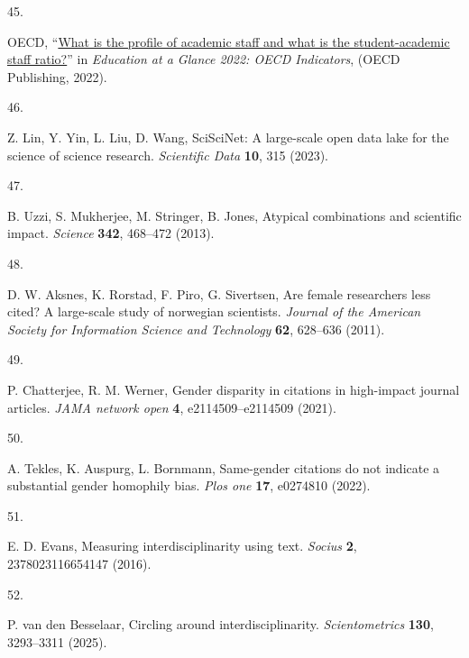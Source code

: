 \documentclass[
  british,
  12pt, %
]{article}
\newlength{\cslhangindent}
\newlength{\csllabelwidth}
\newenvironment{CSLReferences}[2] %
 {\begin{list}{}{%
  \setlength{\itemindent}{0pt}
  \setlength{\leftmargin}{0pt}
  \setlength{\parsep}{0pt}
  \ifodd #1
   \setlength{\leftmargin}{\cslhangindent}
   \setlength{\itemindent}{-1\cslhangindent}
  \fi
  \setlength{\itemsep}{#2\baselineskip}}}
 {\end{list}}
\newcommand{\CSLLeftMargin}[1]{\parbox[t]{\csllabelwidth}{\strut#1\strut}}
\newcommand{\CSLRightInline}[1]{\parbox[t]{\linewidth - \csllabelwidth}{\strut#1\strut}}
\providecommand{\DIFaddbegin}{} %
\providecommand{\DIFaddend}{} %
\providecommand{\DIFdelbegin}{} %
\providecommand{\DIFdelend}{} %
\providecommand{\DIFscaledelfig}{0.5}
\newlength{\DIFdelgraphicswidth} %
\newlength{\DIFdelgraphicsheight} %
\providecommand{\DIFaddincludegraphics}[2][]{{\color{blue}\fbox{\DIFOincludegraphics[#1]{#2}}}} %
\providecommand{\DIFdelincludegraphics}[2][]{%
\sbox{\DIFdelgraphicsbox}{\DIFOincludegraphics[#1]{#2}}%
\settoboxwidth{\DIFdelgraphicswidth}{\DIFdelgraphicsbox} %
\settoboxtotalheight{\DIFdelgraphicsheight}{\DIFdelgraphicsbox} %
\scalebox{\DIFscaledelfig}{%
\parbox[b]{\DIFdelgraphicswidth}{\usebox{\DIFdelgraphicsbox}\\[-\baselineskip] \rule{\DIFdelgraphicswidth}{0em}}\llap{\resizebox{\DIFdelgraphicswidth}{\DIFdelgraphicsheight}{%
\setlength{\unitlength}{\DIFdelgraphicswidth}%
\begin{picture}(1,1)%
\thicklines\linethickness{2pt} %
{\color[rgb]{1,0,0}\put(0,0){\framebox(1,1){}}}%
{\color[rgb]{1,0,0}\put(0,0){\line( 1,1){1}}}%
{\color[rgb]{1,0,0}\put(0,1){\line(1,-1){1}}}%
\end{picture}%
}\hspace*{3pt}}} %
} %
\DeclareRobustCommand{\DIFaddbegin}{\DIFOaddbegin \let\includegraphics\DIFaddincludegraphics} %
\DeclareRobustCommand{\DIFaddend}{\DIFOaddend \let\includegraphics\DIFOincludegraphics} %
\DeclareRobustCommand{\DIFdelbegin}{\DIFOdelbegin \let\includegraphics\DIFdelincludegraphics} %
\DeclareRobustCommand{\DIFdelend}{\DIFOaddend \let\includegraphics\DIFOincludegraphics} %
\begin{document}
\begin{CSLReferences}{0}{1}
\CSLLeftMargin{45. }%
\CSLRightInline{OECD, {``\href{https://doi.org/10.1787/bb6ee273-en}{What is the profile of academic staff and what is the student-academic staff ratio?}''} in \emph{Education at a Glance 2022: OECD Indicators}, (OECD Publishing, 2022).}

\CSLLeftMargin{46. }%
\CSLRightInline{Z. Lin, Y. Yin, L. Liu, D. Wang, SciSciNet: A large-scale open data lake for the science of science research. \emph{Scientific Data} \textbf{10}, 315 (2023).}

\CSLLeftMargin{47. }%
\CSLRightInline{B. Uzzi, S. Mukherjee, M. Stringer, B. Jones, Atypical combinations and scientific impact. \emph{Science} \textbf{342}, 468--472 (2013).}

\CSLLeftMargin{48. }%
\CSLRightInline{D. W. Aksnes, K. Rorstad, F. Piro, G. Sivertsen, Are female researchers less cited? A large-scale study of norwegian scientists. \emph{Journal of the American Society for Information Science and Technology} \textbf{62}, 628--636 (2011).}

\CSLLeftMargin{49. }%
\CSLRightInline{P. Chatterjee, R. M. Werner, Gender disparity in citations in high-impact journal articles. \emph{JAMA network open} \textbf{4}, e2114509--e2114509 (2021).}

\CSLLeftMargin{50. }%
\CSLRightInline{A. Tekles, K. Auspurg, L. Bornmann, Same-gender citations do not indicate a substantial gender homophily bias. \emph{Plos one} \textbf{17}, e0274810 (2022).}

\CSLLeftMargin{51. }%
\CSLRightInline{E. D. Evans, Measuring interdisciplinarity using text. \emph{Socius} \textbf{2}, 2378023116654147 (2016).}

\DIFdelbegin {}
\DIFdelend \DIFaddbegin {}
\DIFaddend \CSLLeftMargin{52. }%
\DIFdelbegin %
\DIFdelend \DIFaddbegin \CSLRightInline{P. van den Besselaar, Circling around interdisciplinarity. \emph{Scientometrics} \textbf{130}, 3293--3311 (2025).}
\DIFaddend 


\end{CSLReferences}
\end{document}
